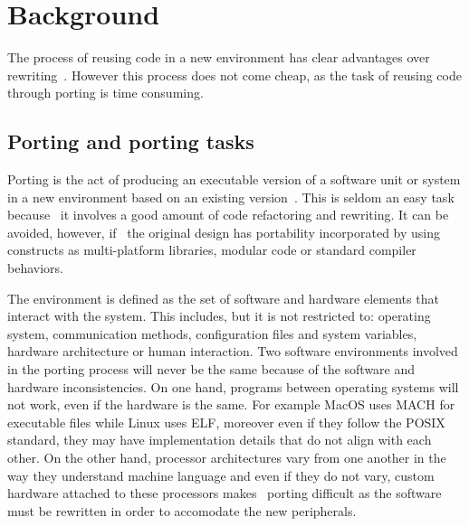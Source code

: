 \chapter{Background} \label{sec:background}

The process of reusing code in a new environment has clear advantages over
rewriting~\cite{frakes1995sixteen}. However this process does not come cheap, as
the task of reusing code through porting is time consuming.


\section{Porting and porting tasks}

Porting is the act of producing an executable version of a software unit or
system in a new environment based on an existing
version~\cite{mooney1990strategies}. This is
seldom an easy task because~ it involves a good amount of code refactoring and
rewriting. It can be avoided, however, if~ the original design has portability
incorporated by using constructs as multi-platform libraries, modular code or
standard compiler behaviors.~

The environment is defined as the set of software and hardware elements that
interact with the system. This includes, but it is not restricted to: operating
system, communication methods, configuration files and system variables,
hardware architecture or human interaction. Two software environments involved
in the porting process will never be the same because of the software and
hardware inconsistencies. On one hand, programs between operating systems will
not work, even if the hardware is the same. For example MacOS uses MACH for
executable files while Linux uses ELF, moreover even if they follow the POSIX
standard, they may have implementation details that do not align with each
other. On the other hand, processor architectures vary from one another in the
way they understand machine language and even if they do not vary, custom
hardware attached to these processors makes~ porting difficult as the software
must be rewritten in order to accomodate the new peripherals.

